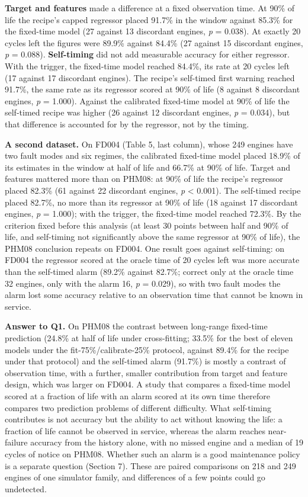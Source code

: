 \documentclass[a4paper,fleqn,doubleblind]{cas-dc}
\begin{document}
\textbf{Target and features} made a difference at a fixed observation time. At 90\% of life the recipe's capped regressor placed 91.7\% in the window against 85.3\% for the fixed-time model (27 against 13 discordant engines, \textit{p} = 0.038). At exactly 20 cycles left the figures were 89.9\% against 84.4\% (27 against 15 discordant engines, \textit{p} = 0.088). \textbf{Self-timing} did not add measurable accuracy for either regressor. With the trigger, the fixed-time model reached 84.4\%, its rate at 20 cycles left (17 against 17 discordant engines). The recipe's self-timed first warning reached 91.7\%, the same rate as its regressor scored at 90\% of life (8 against 8 discordant engines, \textit{p} = 1.000). Against the calibrated fixed-time model at 90\% of life the self-timed recipe was higher (26 against 12 discordant engines, \textit{p} = 0.034), but that difference is accounted for by the regressor, not by the timing.

\textbf{A second dataset.} On FD004 (Table 5, last column), whose 249 engines have two fault modes and six regimes, the calibrated fixed-time model placed 18.9\% of its estimates in the window at half of life and 66.7\% at 90\% of life. Target and features mattered more than on PHM08: at 90\% of life the recipe's regressor placed 82.3\% (61 against 22 discordant engines, \textit{p} < 0.001). The self-timed recipe placed 82.7\%, no more than its regressor at 90\% of life (18 against 17 discordant engines, \textit{p} = 1.000); with the trigger, the fixed-time model reached 72.3\%. By the criterion fixed before this analysis (at least 30 points between half and 90\% of life, and self-timing not significantly above the same regressor at 90\% of life), the PHM08 conclusion repeats on FD004. One result goes against self-timing: on FD004 the regressor scored at the oracle time of 20 cycles left was more accurate than the self-timed alarm (89.2\% against 82.7\%; correct only at the oracle time 32 engines, only with the alarm 16, \textit{p} = 0.029), so with two fault modes the alarm lost some accuracy relative to an observation time that cannot be known in service.

\textbf{Answer to Q1.} On PHM08 the contrast between long-range fixed-time prediction (24.8\% at half of life under cross-fitting; 33.5\% for the best of eleven models under the fit-75\%/calibrate-25\% protocol, against 89.4\% for the recipe under that protocol) and the self-timed alarm (91.7\%) is mostly a contrast of observation time, with a further, smaller contribution from target and feature design, which was larger on FD004. A study that compares a fixed-time model scored at a fraction of life with an alarm scored at its own time therefore compares two prediction problems of different difficulty. What self-timing contributes is not accuracy but the ability to act without knowing the life: a fraction of life cannot be observed in service, whereas the alarm reaches near-failure accuracy from the history alone, with no missed engine and a median of 19 cycles of notice on PHM08. Whether such an alarm is a good maintenance policy is a separate question (Section 7). These are paired comparisons on 218 and 249 engines of one simulator family, and differences of a few points could go undetected.
\end{document}
